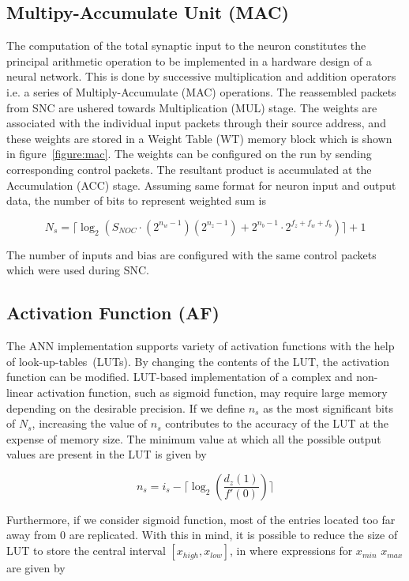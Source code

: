 \subsection{Multipy-Accumulate Unit (MAC)}
The computation of the total synaptic input to the neuron constitutes the principal arithmetic operation to be implemented in a hardware design of a neural network. 
This is done by successive multiplication and addition operators i.e. a series of Multiply-Accumulate (MAC) operations. 
The reassembled packets from SNC are ushered towards Multiplication (MUL) stage. 
The weights are associated with the individual input packets through their source address, and these weights are stored in a Weight Table (WT) memory block which is shown in figure~\ref {figure:mac}. 
The weights can be configured on the run by sending corresponding control packets. 
The resultant product is accumulated at the Accumulation (ACC) stage. 
Assuming same format for neuron input and output data, the number of bits to represent weighted sum is

\begin{equation}
N_{s}=\lceil\log_{2}(S_{NOC}\cdot (2^{n_{w}-1})(2^{n_{z}-1})+2^{n_{b}-1}\cdot 2^{f_{z}+f_{w}+f_{b}})\rceil+1
\label{equation:Ns}
\end{equation}

The number of inputs and bias are configured with the same control packets which were used during SNC.  

\subsection{Activation Function (AF)}
The ANN implementation supports variety of activation functions with the help of look-up-tables~(LUTs).
By changing the contents of the LUT, the activation function can be modified.
LUT-based implementation of a complex and non-linear activation function, such as sigmoid function, may require large memory depending on the desirable precision.  
If we define $n_{s}$ as the most significant bits of $N_{s}$, increasing the value of $n_{s}$ contributes to the accuracy of the LUT at the expense of memory size. 
The minimum value at which all the possible output values are present in the LUT is given by

\begin{equation}
n_{s}=i_{s}-\lceil\log_{2}(\frac{d_{z}(1)}{{f}'(0)})\rceil
\label{equation:ns}
\end{equation}

Furthermore, if we consider sigmoid function, most of the entries located too far away from 0 are replicated. 
With this in mind, it is possible to reduce the size of LUT to store the central interval $[x_{high}, x_{low}]$, in where expressions for $x_{min}$ $x_{max}$ are given by


